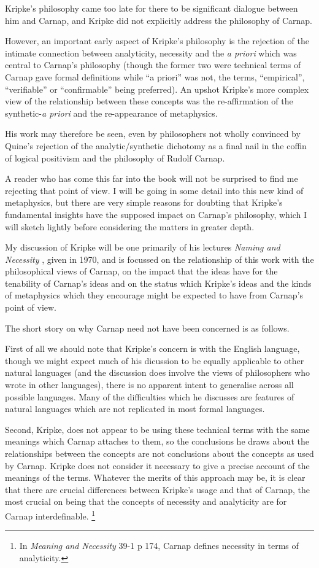 Kripke's philosophy came too late for there to be significant dialogue
between him and Carnap, and Kripke did not explicitly address the
philosophy of Carnap.

However, an important early aspect of Kripke's philosophy is the rejection
of the intimate connection between analyticity, necessity and the \emph{a priori}
which was central to Carnap's philosophy (though the former two were
technical terms of Carnap gave formal definitions while ``a priori'' was
not, the terms, ``empirical'', ``verifiable'' or ``confirmable'' being preferred).
An upshot Kripke's more complex view of the relationship between these concepts
was the re-affirmation of the synthetic-\emph{a priori} and the re-appearance of
metaphysics.

His work may therefore be seen, even by philosophers not wholly convinced
by Quine's rejection of the analytic/synthetic dichotomy as a final nail
in the coffin of logical positivism and the philosophy of Rudolf Carnap.

A reader who has come this far into the book will not be surprised to find
me rejecting that point of view.
I will be going in some detail into this new kind of metaphysics, but there
are very simple reasons for doubting that Kripke's fundamental insights have
the supposed impact on Carnap's philosophy, which I will sketch lightly
before considering the matters in greater depth.

My discussion of Kripke will be one primarily of his lectures
\emph{Naming and Necessity} \cite{kripke72}, given in 1970, and is focussed
on the relationship of this work with the philosophical views of Carnap, on
the impact that the ideas have for the tenability of Carnap's ideas
and on the status which Kripke's ideas and the kinds of metaphysics which
they encourage might be expected to have from Carnap's point of view.

The short story on why Carnap need not have been concerned is as follows.

First of all we should note that Kripke's concern is with the English
language, though we might expect much of his dicussion to be equally
applicable to other natural languages (and the discussion does involve
the views of philosophers who wrote in other languages), there is no
apparent intent to generalise across all possible languages.
Many of the difficulties which he discusses are features of natural
languages which are not replicated in most formal languages.

Second, Kripke, does not appear to be using these technical terms
with the same meanings which Carnap attaches to them, so the conclusions
he draws about the relationships between the concepts are not
conclusions about the concepts as used by Carnap.
Kripke does not consider it necessary to give a precise account
of the meanings of the terms.
Whatever the merits of this approach may be, it is clear that there are
crucial differences between Kripke's usage and that of Carnap, the most
crucial on being that the concepts of necessity and analyticity are for
Carnap interdefinable.
\footnote{In \emph{Meaning and Necessity} \cite{carnap47} 39-1 p 174, Carnap defines necessity in terms
of analyticity.}

